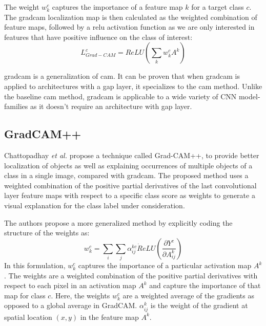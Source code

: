 The weight $w_{k}^{c}$ captures the importance of a feature map $k$ for a target class $c$. The \acrshort{gradcam} localization map is then calculated as the weighted combination of feature maps, followed by a \acrshort{relu} activation function as we are only interested in features that have positive influence on the class of interest:
\begin{equation}
    L_{Grad-CAM}^{c} = ReLU \left( \sum_{k}w_{k}^{c} A^{k} \right)
\end{equation}

\acrshort{gradcam} is a generalization of \acrshort{cam}. It can be proven that when \acrshort{gradcam} is applied to architectures with a \acrshort{gap} layer, it specializes to the \acrshort{cam} method. Unlike the baseline \acrshort{cam} method, \acrshort{gradcam} is applicable to a wide variety of CNN model-families as it doesn't require an architecture with \acrshort{gap} layer.

\subsection{GradCAM++}
Chattopadhay \textit{et al.} \cite{chattopadhay2018grad} propose a technique called Grad-CAM++, to provide better localization of objects
as well as explaining occurrences of multiple objects of a class in a single image, compared with \acrshort{gradcam}. The proposed method uses a weighted combination of the positive partial derivatives of the last convolutional layer feature maps with respect to a specific class score as weights to generate a visual explanation for the class label under consideration.

The authors propose a more generalized method by explicitly coding the structure of the weights as:
\begin{equation}
    w_{k}^{c} = \sum_{i} \sum_{j} \alpha_{ij}^{kc} \dot ReLU \left( \frac{\partial{Y^c}}{\partial{A_{ij}^{k}}} \right)
\end{equation}
In this formulation, $w_{k}^{c}$ captures the importance of a particular activation map $A^k$. The weights are a weighted combination of the positive
partial derivatives with respect to each pixel in an activation map $A^k$ and capture the importance of that map for class $c$. Here, the weights $w_k^c$ are a weighted average of the gradients as opposed to a global average in GradCAM. $\alpha_{ij}^{k}$ is the weight of the gradient at spatial location $(x,y)$ in the feature map $A^k$. 

